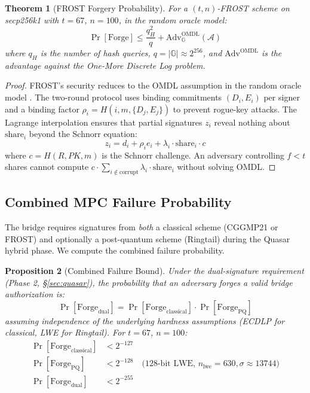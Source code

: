 \documentclass[11pt]{article}
\newtheorem{theorem}{Theorem}
\newtheorem{proposition}[theorem]{Proposition}
\begin{document}
\begin{theorem}[FROST Forgery Probability]
For a $(t, n)$-FROST scheme on secp256k1 with $t = 67$, $n = 100$, in the random oracle model:
\begin{equation}
\Pr[\text{Forge}] \leq \frac{q_H^2}{q} + \text{Adv}^{\text{OMDL}}_{\mathbb{G}}(\mathcal{A})
\end{equation}
where $q_H$ is the number of hash queries, $q = |\mathbb{G}| \approx 2^{256}$, and $\text{Adv}^{\text{OMDL}}$ is the advantage against the One-More Discrete Log problem.
\end{theorem}

\begin{proof}
FROST's security reduces to the OMDL assumption in the random oracle model \cite{frost}. The two-round protocol uses binding commitments $(D_i, E_i)$ per signer and a binding factor $\rho_i = H(i, m, \{D_j, E_j\})$ to prevent rogue-key attacks. The Lagrange interpolation ensures that partial signatures $z_i$ reveal nothing about $\text{share}_i$ beyond the Schnorr equation:
\begin{equation}
z_i = d_i + \rho_i e_i + \lambda_i \cdot \text{share}_i \cdot c
\end{equation}
where $c = H(R, PK, m)$ is the Schnorr challenge. An adversary controlling $f < t$ shares cannot compute $c \cdot \sum_{i \notin \text{corrupt}} \lambda_i \cdot \text{share}_i$ without solving OMDL.
\end{proof}

\subsection{Combined MPC Failure Probability}\label{subsec:combined-failure}

The bridge requires signatures from \emph{both} a classical scheme (CGGMP21 or FROST) and optionally a post-quantum scheme (Ringtail) during the Quasar hybrid phase. We compute the combined failure probability.

\begin{proposition}[Combined Failure Bound]
Under the dual-signature requirement (Phase 2, \S\ref{sec:quasar}), the probability that an adversary forges a valid bridge authorization is:
\begin{equation}
\Pr[\text{Forge}_{\text{dual}}] = \Pr[\text{Forge}_{\text{classical}}] \cdot \Pr[\text{Forge}_{\text{PQ}}]
\end{equation}
assuming independence of the underlying hardness assumptions (ECDLP for classical, LWE for Ringtail). For $t = 67$, $n = 100$:
\begin{align}
\Pr[\text{Forge}_{\text{classical}}] &< 2^{-127} \\
\Pr[\text{Forge}_{\text{PQ}}] &< 2^{-128} \quad \text{(128-bit LWE, } n_{\text{lwe}} = 630, \sigma \approx 13744\text{)} \\
\Pr[\text{Forge}_{\text{dual}}] &< 2^{-255}
\end{align}
\end{proposition}
\end{document}
